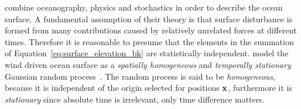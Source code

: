 \citeauthor{Neumann:1966} combine oceanography, physics and stochastics in order
to describe the ocean surface. A fundamental assumption of their theory is that
surface disturbance is formed from many contributions caused by relatively
unrelated forces at different times. Therefore it is reasonable to presume that
the elements in the summation of Equation~\ref{eq:surface_elevation_bk} are
statistically independent.
\citeauthor{Neumann:1966} model the wind driven ocean surface as a
\emph{spatially homogeneous} and \emph{temporally stationary} Gaussian random
process~\citep{book:grimmett2001}. The random process is said to be
\emph{homogeneous}, because it is independent of the origin selected for
positions $\mathbf{x}$, furthermore it is \emph{stationary} since absolute time is
irrelevant, only time difference matters.
%
